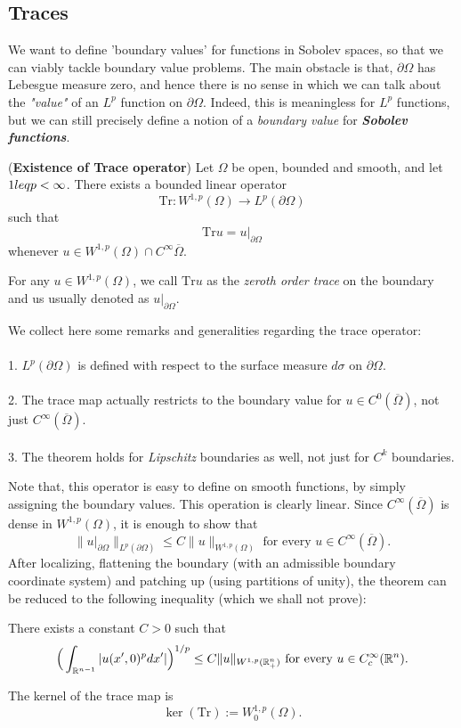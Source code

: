 \subsection{Traces}\label{app:trace}
We want to define 'boundary values' for functions in Sobolev spaces, so that we can viably tackle boundary value problems. The main obstacle is that, $\partial\Omega$ has Lebesgue measure zero, and hence there is no sense in which we can talk about the \emph{"value"} of an $L^p$ function on $\partial \Omega$. Indeed, this is meaningless for $L^p$ functions, but we can still precisely define a notion of a \emph{boundary value} for \emph{\textbf{Sobolev functions}}. 
\begin{theorem}
    (\textbf{Existence of Trace operator}) Let $\Omega$ be open, bounded and smooth, and let $1\\leq p<\infty$. There exists a bounded linear operator $$\mathrm{Tr}:W^{1,p}(\Omega)\to L^p(\partial\Omega)$$ such that $$\mathrm{Tr}u=u|_{\partial\Omega}$$
whenever $u\in W^{1,p}(\Omega)\cap C^\infty{\overline\Omega}$.
\end{theorem}
For any $u\in W^{1,p}(\Omega)$, we call $\mathrm{Tr}u$ as the \emph{zeroth order trace} on the boundary and us usually denoted as $u|_{\partial\Omega}$.
\begin{remark} We collect here some remarks and generalities regarding the trace operator:
\\\\ 1. $L^p(\partial\Omega)$ is defined with respect to the surface measure $d\sigma$ on $\partial\Omega$.
\\\\ 2. The trace map actually restricts to the boundary value for $u\in C^0(\overline\Omega)$, not just $C^{\infty}(\overline\Omega)$.
\\\\ 3. The theorem holds for \emph{Lipschitz} boundaries as well, not just for $C^k$ boundaries. 
\end{remark}
Note that, this operator is easy to define on smooth functions, by simply assigning the boundary values. This operation is clearly linear. Since $C^{\infty}(\overline\Omega)$ is dense in $W^{1,p}(\Omega)$, it is enough to show that $$ \|u|_{\partial\Omega}\|_{L^p(\partial\Omega)}\leq C \|u\|_{W^{1,p}(\Omega)} \text{ for every }u\in C^{\infty}(\overline\Omega).$$
After localizing, flattening the boundary (with an admissible boundary coordinate system) and patching up (using partitions of unity), the theorem can be reduced to the following inequality (which we shall not prove): 
\begin{proposition}
    There exists a constant $C>0$ such that $$\Big{(}\int_{\mathbb{R}^{n-1}} |u(x',0)^p dx'|\Big{)}^{1/p}\leq C \|u\|_{W^{1,p}(\mathbb{R}^n_+)} \text{ for every }u\in C^{\infty}_c(\mathbb{R}^n).$$
\end{proposition}
\begin{remark} The kernel of the trace map is $$\ker(\mathrm{Tr}):=W^{1,p}_0(\Omega).$$

\end{remark}

